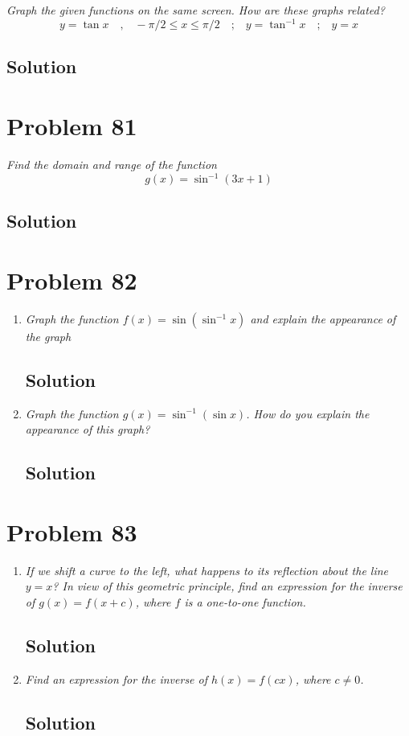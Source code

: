 \documentclass[11pt]{article}
\newcommand{\soln}{\subsection*}
\newcommand{\qn}{\textit}
\newcommand{\eqtext}[1]{\quad\text{#1}\quad}
\begin{document}
\qn{Graph the given functions on the same screen. How are these graphs related? $$y=\tan{x} \eqtext{,} -\pi/2 \le x \le \pi/2 \eqtext{;} y=\tan^{-1}x \eqtext{;} y=x$$}
\soln{Solution}

\section*{Problem 81}

\qn{Find the domain and range of the function $$g(x)=\sin^{-1}(3x+1)$$}

\soln{Solution}

\section*{Problem 82}

\begin{enumerate}
	\item \qn{Graph the function $f(x)=\sin(\sin^{-1}x)$ and explain the appearance of the graph}
	\soln{Solution}
	
	\item \qn{Graph the function $g(x)=\sin^{-1}(\sin{x})$. How do you explain the appearance of this graph?}
	\soln{Solution}
\end{enumerate}

\section*{Problem 83}

\begin{enumerate}
	\item \qn{If we shift a curve to the left, what happens to its reflection about the line $y=x$? In view of this geometric principle, find an expression for the inverse of $g(x)=f(x+c)$, where $f$ is a one-to-one function.}
	\soln{Solution}
	
	\item \qn{Find an expression for the inverse of $h(x)=f(cx)$, where $c \ne 0$.}
	\soln{Solution}
\end{enumerate}
\end{document}

